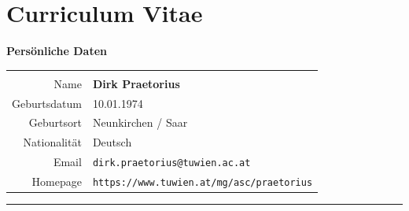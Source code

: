\documentclass[a4paper,11pt,bibliography=totoc,listof=totoc,headinclude=true,cleardoublepage=empty,oneside]{NumPDEsThesis}
\begin{document}





\printbibliography


\chapter*{Curriculum Vitae}
\thispagestyle{empty}

\noindent
{\bfseries\Large Persönliche Daten}

\begin{tabular}{rp{}}
\hspace*{.2\textwidth}&\\
Name & {\bfseries Dirk Praetorius} \\
Geburtsdatum & 10.01.1974 \\
Geburtsort & Neunkirchen / Saar \\
Nationalität & Deutsch \\
Email & \verb$dirk.praetorius@tuwien.ac.at$ \\
Homepage & \verb$https://www.tuwien.at/mg/asc/praetorius$ \\
\end{tabular}

\bigskip
\bigskip
\hrule
\bigskip
\bigskip
\end{document}
